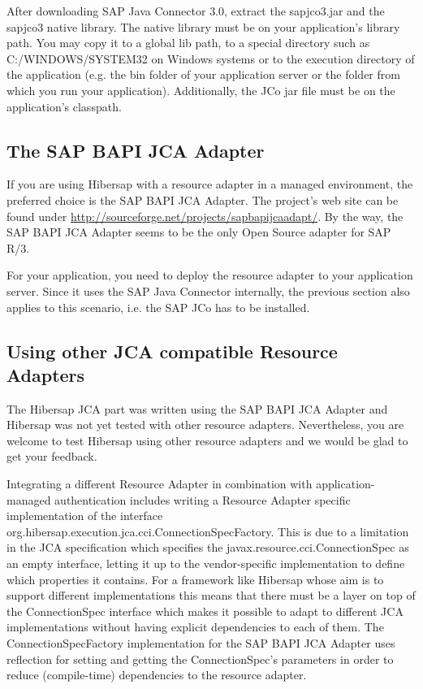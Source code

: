 After downloading SAP Java Connector 3.0, extract the sapjco3.jar and the sapjco3 native library. The native library must be on your application's library path. You may copy it to a global lib path, to a special directory such as C:/WINDOWS/SYSTEM32 on Windows systems or to the execution directory of the application (e.g. the bin folder of your application server or the folder from which you run your application). Additionally, the JCo jar file must be on the application's classpath. 

\subsection{The SAP BAPI JCA Adapter}
If you are using Hibersap with a resource adapter in a managed environment, the preferred choice is the SAP BAPI JCA Adapter. The project's web site can be found under \url{http://sourceforge.net/projects/sapbapijcaadapt/}. By the way, the SAP BAPI JCA Adapter seems to be the only Open Source adapter for SAP R/3.

For your application, you need to deploy the resource adapter to your application server. Since it uses the SAP Java Connector internally, the previous section also applies to this scenario, i.e. the SAP JCo has to be installed. 

\subsection{Using other JCA compatible Resource Adapters}
The Hibersap JCA part was written using the SAP BAPI JCA Adapter and Hibersap was not yet tested with other resource adapters. Nevertheless, you are welcome to test Hibersap using other resource adapters and we would be glad to get your feedback. 

Integrating a different Resource Adapter in combination with application-managed authentication includes writing a Resource Adapter specific implementation of the interface org.hibersap.\-execution.jca.cci.ConnectionSpecFactory. This is due to a limitation in the JCA specification which specifies the javax.resource.cci.ConnectionSpec as an empty interface, letting it up to the vendor-specific implementation to define which properties it contains. For a framework like Hibersap whose aim is to support different implementations this means that there must be a layer on top of the ConnectionSpec interface which makes it possible to adapt to different JCA implementations without having explicit dependencies to each of them. The ConnectionSpecFactory implementation for the SAP BAPI JCA Adapter uses reflection for setting and getting the ConnectionSpec's parameters in order to reduce (compile-time) dependencies to the resource adapter.

